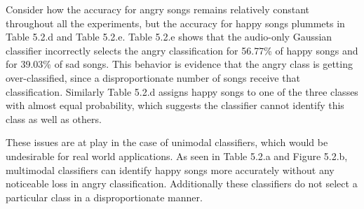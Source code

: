  Consider how  the accuracy for angry songs remains relatively constant throughout all the experiments,
but the accuracy for happy songs plummets in Table 5.2.d and Table 5.2.e. Table 5.2.e shows that the audio-only Gaussian 
classifier incorrectly selects the angry classification for 56.77\% of happy songs and for 39.03\% of sad songs. 
 This behavior is evidence that the angry class is getting over-classified, since a disproportionate number of 
 songs receive that classification.  Similarly Table 5.2.d assigns happy songs
 to one of the three classes with almost equal probability, which suggests the classifier cannot identify this class as well as
 others. 
 
These  issues are at play in the case of unimodal classifiers, which would be undesirable for
real world applications. As seen in Table 5.2.a and Figure 5.2.b,  
multimodal classifiers can identify happy songs more accurately without any noticeable loss in angry classification. 
Additionally these classifiers do not select a particular class in a disproportionate manner. 




